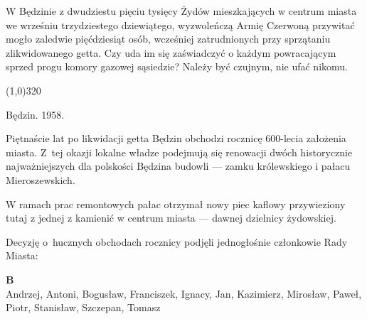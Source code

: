 \documentclass[11pt,a4paper,oneside]{article}
\begin{document}
W Będzinie z dwudziestu pięciu tysięcy Żydów mieszkających w centrum
miasta we wrześniu trzydziestego dziewiątego, wyzwoleńczą Armię
Czerwoną przywitać mogło zaledwie pięćdziesiąt osób, wcześniej zatrudnionych
przy sprzątaniu zlikwidowanego getta. Czy uda im się zaświadczyć o
każdym powracającym sprzed progu komory gazowej sąsiedzie? Należy być
czujnym, nie ufać nikomu.

\line(1,0){320}

Będzin. 1958. %

Piętnaście lat po likwidacji getta Będzin obchodzi rocznicę 600-lecia
założenia miasta. Z~tej okazji lokalne władze podejmują się renowacji
dwóch historycznie najważniejszych dla polskości Będzina budowli --- zamku
królewskiego i pałacu Mieroszewskich.

W ramach prac remontowych pałac otrzymał
nowy piec kaflowy przywieziony tutaj z jednej z kamienić w centrum
miasta --- dawnej dzielnicy żydowskiej.


Decyzję o~hucznych obchodach rocznicy podjęli jednogłośnie członkowie
Rady Miasta:

\textbf{B}\\
Andrzej, Antoni, Bogusław, Franciszek, Ignacy, Jan, Kazimierz, Mirosław, 
Paweł, Piotr, Stanisław, Szczepan, Tomasz
\end{document}
